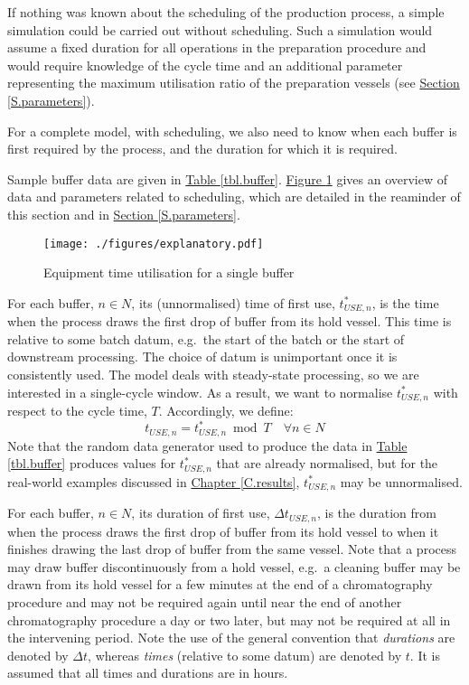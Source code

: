 If nothing was known about the scheduling of the production process, a simple
simulation could be carried out without scheduling.
Such a simulation would assume a fixed duration for all operations in the
preparation procedure and would require knowledge of the cycle time and an
additional parameter representing the maximum utilisation ratio of the
preparation vessels (see \hyperref[S.parameters]{Section \ref*{S.parameters}}).

For a complete model, with scheduling, we also need to know when each buffer
is first required by the process, and the duration for which it is required.

Sample buffer data are given in \hyperref[tbl.buffer]{Table \ref*{tbl.buffer}}.
\hyperref[fig.explanatory]{Figure \ref*{fig.explanatory}} gives an overview of
data and parameters related to scheduling, which are detailed in the reaminder
of this section and in \hyperref[S.parameters]{Section \ref*{S.parameters}}.

\begin{figure}
    \centering
    \texttt{[image: ./figures/explanatory.pdf]}
    \caption{Equipment time utilisation for a single buffer}
    \label{fig.explanatory}
\end{figure}

For each buffer, $n \in N$, its (unnormalised) time of first use,
$t_{\mathit{USE},n}^{*}$, is the time when the process draws the first drop of
buffer from its hold vessel.
This time is relative to some batch datum, e.g.\ the start of the batch or the
start of downstream processing.
The choice of datum is unimportant once it is consistently used. 
The model deals with steady-state processing, so we are interested in a 
single-cycle window.
As a result, we want to normalise $t_{\mathit{USE},n}^{*}$ with respect to the
cycle time, $T$.
Accordingly, we define:
\begin{equation}
    t_{\mathit{USE},n} = t_{\mathit{USE},n}^{*} \enspace \text{mod} \enspace 
    T \quad \forall n \in N
\end{equation}
Note that the random data generator used to produce the data in 
\hyperref[tbl.buffer]{Table \ref*{tbl.buffer}} produces values for 
$t_{\mathit{USE},n}^{*}$ that are already normalised, but for the real-world
examples discussed in \hyperref[C.results]{Chapter \ref*{C.results}}, 
$t_{\mathit{USE},n}^{*}$ may be unnormalised.

For each buffer, $n \in N$, its duration of first use,
$\Delta t_{\mathit{USE},n}$, is the duration from when the process draws the
first drop of buffer from its hold vessel to when it finishes drawing the last
drop of buffer from the same vessel.
Note that a process may draw buffer discontinuously from a hold vessel, e.g.\ a
cleaning buffer may be drawn from its hold vessel for a few minutes at the end
of a chromatography procedure and may not be required again until near the end
of another chromatography procedure a day or two later, but may not be required
at all in the intervening period.
Note the use of the general convention that \emph{durations} are denoted by
$\Delta t$, whereas \emph{times} (relative to some datum) are denoted by $t$.
It is assumed that all times and durations are in hours.

